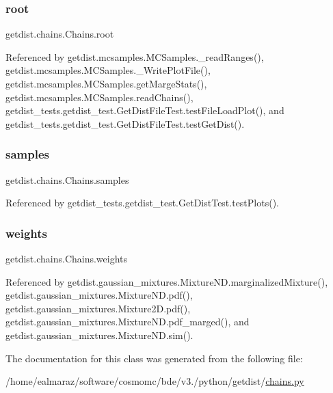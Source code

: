 \subsubsection{\texorpdfstring{root}{root}}
{\footnotesize\ttfamily getdist.\+chains.\+Chains.\+root}



Referenced by getdist.\+mcsamples.\+M\+C\+Samples.\+\_\+read\+Ranges(), getdist.\+mcsamples.\+M\+C\+Samples.\+\_\+\+Write\+Plot\+File(), getdist.\+mcsamples.\+M\+C\+Samples.\+get\+Marge\+Stats(), getdist.\+mcsamples.\+M\+C\+Samples.\+read\+Chains(), getdist\+\_\+tests.\+getdist\+\_\+test.\+Get\+Dist\+File\+Test.\+test\+File\+Load\+Plot(), and getdist\+\_\+tests.\+getdist\+\_\+test.\+Get\+Dist\+File\+Test.\+test\+Get\+Dist().

\mbox{\label{classgetdist_1_1chains_1_1Chains_aa320f1ef8d0d118dd6e328c7a00fdb52}} 
\subsubsection{\texorpdfstring{samples}{samples}}
{\footnotesize\ttfamily getdist.\+chains.\+Chains.\+samples}



Referenced by getdist\+\_\+tests.\+getdist\+\_\+test.\+Get\+Dist\+Test.\+test\+Plots().

\mbox{\label{classgetdist_1_1chains_1_1Chains_a3a9751f705a3a6d28439a4011060f6f8}} 
\subsubsection{\texorpdfstring{weights}{weights}}
{\footnotesize\ttfamily getdist.\+chains.\+Chains.\+weights}



Referenced by getdist.\+gaussian\+\_\+mixtures.\+Mixture\+N\+D.\+marginalized\+Mixture(), getdist.\+gaussian\+\_\+mixtures.\+Mixture\+N\+D.\+pdf(), getdist.\+gaussian\+\_\+mixtures.\+Mixture2\+D.\+pdf(), getdist.\+gaussian\+\_\+mixtures.\+Mixture\+N\+D.\+pdf\+\_\+marged(), and getdist.\+gaussian\+\_\+mixtures.\+Mixture\+N\+D.\+sim().



The documentation for this class was generated from the following file\+:\begin{DoxyCompactItemize}
\item 
/home/ealmaraz/software/cosmomc/bde/v3./python/getdist/\mbox{\hyperlink{chains_8py}{chains.\+py}}\end{DoxyCompactItemize}
